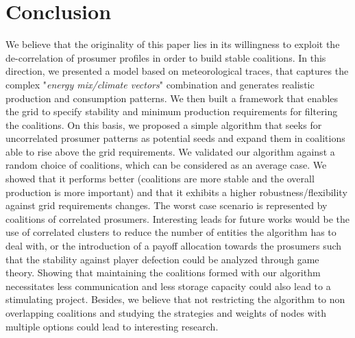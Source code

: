 \documentclass[conference]{IEEEtran}
\begin{document}
%
%
\section{Conclusion}
\label{sec:conclusion}

We believe that the originality of this paper lies in its willingness to exploit the de-correlation of prosumer profiles in order to build stable coalitions. In this direction, we presented a model based on meteorological traces, that captures the complex "\textit{energy mix/climate vectors}" combination and generates realistic production and consumption patterns. We then built a framework that enables the grid to specify stability and minimum production requirements for filtering the coalitions. On this basis, we proposed a simple algorithm that seeks for uncorrelated prosumer patterns as potential seeds and expand them in coalitions able to rise above the grid requirements. We validated our algorithm against a random choice of coalitions, which can be considered as an average case. We showed  that it performs better (coalitions are more stable and the overall production is more important) and that it exhibits a higher robustness/flexibility against grid requirements changes. The worst case scenario is represented by coalitions of correlated prosumers. Interesting leads for future works would be the use of correlated clusters to reduce the number of entities the algorithm has to deal with, or the introduction of a payoff allocation towards the prosumers such that the stability against player defection could be analyzed through game theory. Showing that maintaining the coalitions formed with our algorithm necessitates less communication and less storage capacity could also lead to a stimulating project. Besides, we believe that not restricting the algorithm to non overlapping coalitions and studying the strategies and weights of nodes with multiple options could lead to interesting research.



%
%
 
  

\end{document}
